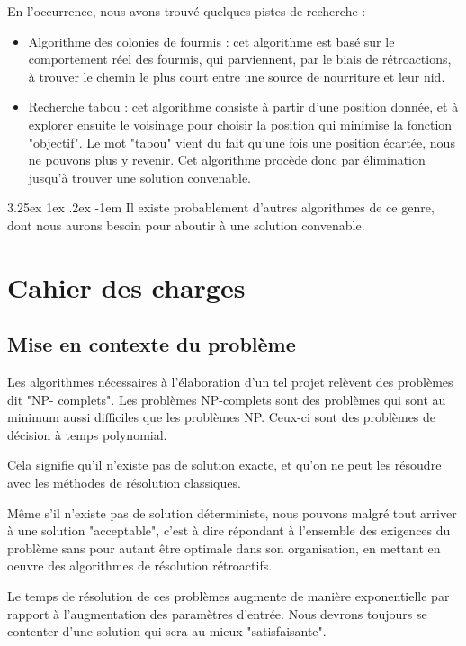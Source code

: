 \documentclass[12pt,a4paper,french]{article}
\makeatletter
\renewcommand\paragraph{\@startsection{paragraph}{5}{\z@}%
  {3.25ex \@plus1ex \@minus.2ex}%
  {-1em}%
  {\normalfont\normalsize\bfseries}}
\makeatother
\begin{document}
En l'occurrence, nous avons trouvé quelques pistes de recherche :
\begin{itemize}
\item Algorithme des colonies de fourmis : cet algorithme est basé sur le comportement réel des fourmis, qui parviennent, par le biais de rétroactions, à trouver le chemin le plus court entre une source de nourriture et leur nid.
\cite{02-algoFourmis}
\item Recherche tabou : cet algorithme consiste à partir d'une position donnée, et à explorer ensuite le voisinage pour choisir la position qui minimise la fonction "objectif". Le mot "tabou" vient du fait qu'une fois une position écartée, nous ne pouvons plus y revenir. Cet algorithme procède donc par élimination jusqu'à trouver une solution convenable.
\cite{03-algoTabou}
\end{itemize}

\paragraph{}
Il existe probablement d'autres algorithmes de ce genre, dont nous aurons besoin pour aboutir à une solution convenable.

\newpage
\section{Cahier des charges}
\subsection{Mise en contexte du problème}

Les algorithmes nécessaires à l'élaboration d'un tel projet relèvent des problèmes dit "NP- complets". Les problèmes NP-complets sont des problèmes qui sont au minimum aussi difficiles que les problèmes NP. Ceux-ci sont des problèmes de décision à temps polynomial.

Cela signifie qu'il n'existe pas de solution exacte, et qu'on ne peut les résoudre avec les méthodes de résolution classiques.

Même s'il n'existe pas de solution déterministe, nous pouvons malgré tout arriver à une solution "acceptable", c'est à dire répondant à l'ensemble des exigences du problème sans pour autant être optimale dans son organisation, en mettant en oeuvre des algorithmes de résolution rétroactifs.

Le temps de résolution de ces problèmes augmente de manière exponentielle par rapport à l'augmentation des paramètres d'entrée. Nous devrons toujours se contenter d'une solution qui sera au mieux "satisfaisante".
\cite{01-npComplet}
\end{document}
